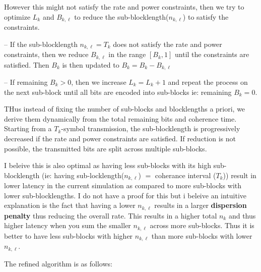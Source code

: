 \documentclass[a4paper, 12pt, onecolumn, journal, twoside, draftclsnofoot]{IEEEtran}
\begin{document}
However this might not satisfy the rate and power constraints, then we try to optimize $L_k$ and $B_{k,\ell}$ to reduce the sub-blocklength($n_{k,\ell}$) to satisfy the constraints.

--\> If the sub-blocklength $n_{k,\ell} = T_k$ does not satisfy the rate and power constraints, then we reduce $B_{k,\ell}$ in the range $[B_k, 1]$ until the constraints are satisfied.
    Then $B_{k}$ is then updated to $B_{k} = B_{k} - B_{k,\ell}$

--\> If remaining $B_{k} >0 $, then we increase $L_k = L_k+1$ and repeat the process on the next sub-block until all bits are encoded into sub-blocks ie: remaining $B_k = 0$.



THus instead of fixing the number of sub-blocks and blocklengths a priori, we derive them dynamically from the total remaining bits and coherence time. Starting from a $T_k$-symbol transmission, the sub-blocklength is progressively decreased if the rate and power constraints are satisfied. If reduction is not possible, the transmitted bits are split across multiple sub-blocks.


I beleive this is also optimal as having less sub-blocks with its high sub-blocklength (ie: having sub-locklength($n_{k,\ell}$) $=$ coherance interval ($T_k$)) result in lower latency in the current simulation as compared to more sub-blocks with lower sub-blocklengths.
I do not have a proof for this but i beleive an intuitive explanation is the fact that having a lower $n_{k,\ell}$ results in a larger \textbf{dispersion penalty} thus reducing the overall rate. This results in a higher total $n_{k}$ and thus higher latency when you sum the smaller $n_{k,\ell}$ across more sub-blocks. 
Thus it is better to have less sub-blocks with higher $n_{k,\ell}$ than more sub-blocks with lower $n_{k,\ell}$.

The refined algorithm is as follows:
\end{document}
